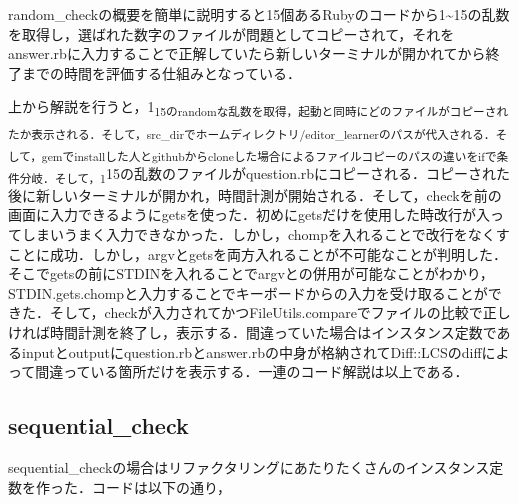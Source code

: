 \documentclass[11pt,dvipdfmx]{jsarticle}
\begin{document}
random\_checkの概要を簡単に説明すると15個あるRubyのコードから1\textasciitilde{}15の乱数を取得し，選ばれた数字のファイルが問題としてコピーされて，それをanswer.rbに入力することで正解していたら新しいターミナルが開かれてから終了までの時間を評価する仕組みとなっている．

上から解説を行うと，1\textsubscript{15のrandomな乱数を取得，起動と同時にどのファイルがコピーされたか表示される．そして，src\_dirでホームディレクトリ/editor\_learnerのパスが代入される．そして，gemでinstallした人とgithubからcloneした場合によるファイルコピーのパスの違いをifで条件分岐．そして，1}15の乱数のファイルがquestion.rbにコピーされる．コピーされた後に新しいターミナルが開かれ，時間計測が開始される．そして，checkを前の画面に入力できるようにgetsを使った．初めにgetsだけを使用した時改行が入ってしまいうまく入力できなかった．しかし，chompを入れることで改行をなくすことに成功．しかし，argvとgetsを両方入れることが不可能なことが判明した．そこでgetsの前にSTDINを入れることでargvとの併用が可能なことがわかり，STDIN.gets.chompと入力することでキーボードからの入力を受け取ることができた．そして，checkが入力されてかつFileUtils.compareでファイルの比較で正しければ時間計測を終了し，表示する．間違っていた場合はインスタンス定数であるinputとoutputにquestion.rbとanswer.rbの中身が格納されてDiff::LCSのdiffによって間違っている箇所だけを表示する．一連のコード解説は以上である．

    \subsection{sequential\_check}\label{sequential_check}

sequential\_checkの場合はリファクタリングにあたりたくさんのインスタンス定数を作った．コードは以下の通り，
\end{document}
